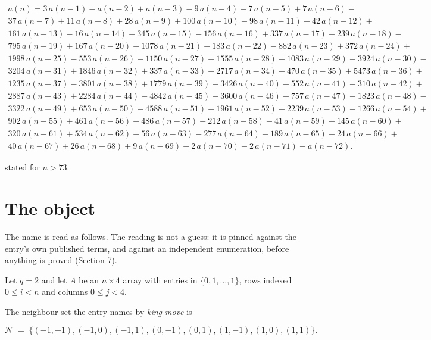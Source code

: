 \documentclass[11pt]{article}
\theoremstyle{definition}
\begin{document}
\begin{multline*} a(n) = 3\,a(n-1) - a(n-2) + a(n-3) - 9\,a(n-4) + 7\,a(n-5) + 7\,a(n-6) - \\ 37\,a(n-7) + 11\,a(n-8) + 28\,a(n-9) + 100\,a(n-10) - 98\,a(n-11) - 42\,a(n-12) + \\ 161\,a(n-13) - 16\,a(n-14) - 345\,a(n-15) - 156\,a(n-16) + 337\,a(n-17) + 239\,a(n-18) - \\ 795\,a(n-19) + 167\,a(n-20) + 1078\,a(n-21) - 183\,a(n-22) - 882\,a(n-23) + 372\,a(n-24) + \\ 1998\,a(n-25) - 553\,a(n-26) - 1150\,a(n-27) + 1555\,a(n-28) + 1083\,a(n-29) - 3924\,a(n-30) - \\ 3204\,a(n-31) + 1846\,a(n-32) + 337\,a(n-33) - 2717\,a(n-34) - 470\,a(n-35) + 5473\,a(n-36) + \\ 1235\,a(n-37) - 3801\,a(n-38) + 1779\,a(n-39) + 3426\,a(n-40) + 552\,a(n-41) - 310\,a(n-42) + \\ 2887\,a(n-43) + 2284\,a(n-44) - 4842\,a(n-45) - 3600\,a(n-46) + 757\,a(n-47) - 1823\,a(n-48) - \\ 3322\,a(n-49) + 653\,a(n-50) + 4588\,a(n-51) + 1961\,a(n-52) - 2239\,a(n-53) - 1266\,a(n-54) + \\ 902\,a(n-55) + 461\,a(n-56) - 486\,a(n-57) - 212\,a(n-58) - 41\,a(n-59) - 145\,a(n-60) + \\ 320\,a(n-61) + 534\,a(n-62) + 56\,a(n-63) - 277\,a(n-64) - 189\,a(n-65) - 24\,a(n-66) + \\ 40\,a(n-67) + 26\,a(n-68) + 9\,a(n-69) + 2\,a(n-70) - 2\,a(n-71) - a(n-72). \end{multline*}

stated for $n > 73$.

\section{The object}

The name is read as follows. The reading is not a guess: it is pinned against the entry's own published terms, and against an independent enumeration, before anything is proved (Section 7).

Let $q = 2$ and let $A$ be an $n \times 4$ array with entries in $\{0,1,\dots,1\}$, rows indexed $0 \le i < n$ and columns $0 \le j < 4$.

The neighbour set the entry names by {\itshape king-move} is

\[\mathcal{N} \;=\; \{(-1,-1), (-1,0), (-1,1), (0,-1), (0,1), (1,-1), (1,0), (1,1)\}.\]
\end{document}
